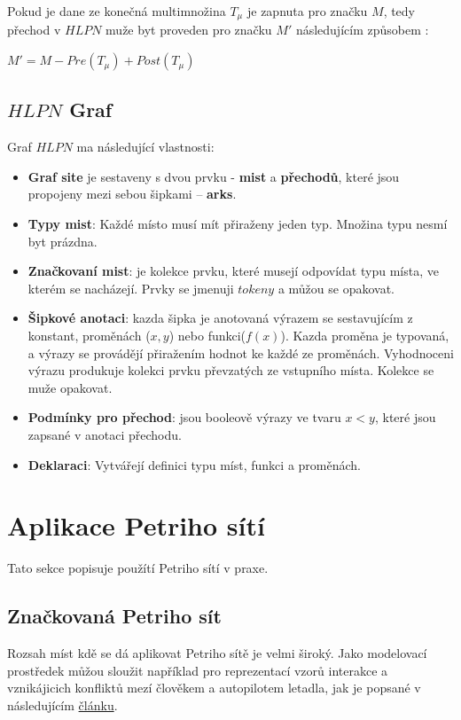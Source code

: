 Pokud je dane ze konečná multimnožina $T_\mu$ je zapnuta pro značku $M$, tedy přechod v $HLPN$ muže byt proveden pro značku $M'$ následujícím způsobem \cite[p.~12]{pnstd54}:
\begin{center}
  $M' = M - Pre(T_\mu) + Post(T_\mu)$
\end{center}


\subsection{$HLPN$ Graf}
\label{subsec:hlpn-graph}

Graf $HLPN$ ma následující vlastnosti:
\begin{itemize}
  \item \textbf{Graf site} je sestaveny s dvou prvku - \textbf{mist} a \textbf{přechodů}, které jsou propojeny mezi sebou šipkami -- \textbf{arks}.
  \item \textbf{Typy mist}: Každé místo musí mít přiraženy jeden typ. Množina typu nesmí byt prázdna.
  \item \textbf{Značkovaní mist}: je kolekce prvku, které musejí odpovídat typu místa, ve kterém se nacházejí. Prvky se jmenuji $tokeny$ a můžou se opakovat.
  \item \textbf{Šipkové anotaci}: kazda šipka je anotovaná výrazem se sestavujícím z konstant, proměnách ($x, y$) nebo funkci($f(x)$). Kazda proměna je typovaná, a výrazy se provádějí přiražením hodnot ke každé ze proměnách. Vyhodnoceni výrazu produkuje kolekci prvku převzatých ze vstupního místa. Kolekce se muže opakovat.
  \item \textbf{Podmínky pro přechod}: jsou booleově výrazy ve tvaru $x < y$, které jsou zapsané v anotaci přechodu.
  \item \textbf{Deklaraci}: Vytvářejí definici typu míst, funkci a proměnách.
\end{itemize}

\section{Aplikace Petriho sítí}
\label{sec:pn-application}
Tato sekce popisuje použítí Petriho sítí v praxe.

\subsection{Značkovaná Petriho sít}
Rozsah míst kdě se dá aplikovat Petriho sítě je velmi široký. Jako modelovací prostředek můžou sloužit například pro reprezentací vzorů interakce a vznikájicich konfliktů mezí člověkem a autopilotem letadla, jak je popsané v následujícím \href{https://www-tandfonline-com.ezproxy.lib.vutbr.cz/doi/full/10.1080/00140139.2013.877597}{článku}.

